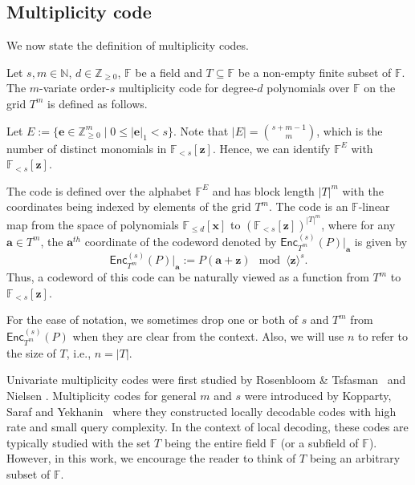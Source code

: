 \documentclass{theoretics}
\def\Integer{\mathbb{Z}}
\def\Natural{\mathbb{N}}
\def\Field{\mathbb{F}}
\let\N\Natural
\let\Z\Integer
\let\F\Field
\def\veca{\mathbf{a}}
\def\vece{\mathbf{e}}
\def\vecx{\mathbf{x}}
\def\vecz{\mathbf{z}}
\newcommand{\enc}{{\mathsf{Enc}}}
\newcommand{\encst}{{\mathsf{Enc}_{T^m}^{(s)}}}
\newcommand{\vz}{\vecz}
\newcommand{\vx}{\vecx}
\newcommand{\ve}{\vece}
\newcommand{\va}{\veca}
\begin{document}
	
	\subsection{Multiplicity code}\label{sec:mult}
	We now state the definition of multiplicity codes. 
	\begin{definition}\label{def:multiplicity code}
		Let $s, m \in \N$, $d \in \Z_{\geq 0}$, $\F$ be a field and $T \subseteq \F$ be a non-empty finite subset of $\F$. The $m$-variate order-$s$ multiplicity code for degree-$d$ polynomials over $\F$ on the grid $T^m$ is defined as follows.
		
		Let
		$E := \{\ve \in \Z_{\geq 0}^m \mid 0 \leq |\ve |_1 <
		s\}$.  Note that
		$|E| = \binom{s+ m -1}{m}$, which is the number of distinct
		monomials in $\F_{<s}[\vz]$. Hence, we can identify $\F^E$ with
		$\F_{<s}[\vz]$.
		
		The code is defined over the alphabet $\F^E$ and has block length $|T|^m$ with the coordinates being indexed by elements of the grid $T^m$. The code is an $\F$-linear map from  the space of polynomials $\F_{\leq d}[\vx]$ to $\left(\F_{< s}[\vz]\right)^{|T|^m}$, where for any $\va \in T^m$, the $\va^{th}$ coordinate of the codeword denoted by $\enc_{T^m}^{(s)}(P)|_{\va}$ is given by
		\[
		\enc_{T^m}^{(s)}(P)|_{\va} := P(\va + \vz) \mod \langle \vz \rangle^s. 
		\] 
		Thus, a codeword of this code can be naturally viewed as a function from $T^m$ to $\F_{<s}[\vz]$. 
	\end{definition}
	
	
	\begin{remark}\label{rmk: notation enc}
		For the ease of notation, we sometimes drop one or both of $s$ and
		$T^m$ from $\encst(P)$ when they are clear from the context. Also, we
		will use $n$ to refer to the size of $T$, i.e., $n= |T|$.
	\end{remark}
	
	Univariate multiplicity codes were first studied by Rosenbloom \&
	Tsfasman~\cite{RosenbloomT1997} and Nielsen
	\cite{Nielsen2001}. Multiplicity codes for general $m$ and $s$ were
	introduced by Kopparty, Saraf and Yekhanin~\cite{KoppartySY2014} where 
	they constructed locally decodable codes with high rate and small
	query complexity. In the context of local decoding, these codes are
	typically studied with the set $T$ being the entire field $\F$ (or a subfield of $\F$). However,
	in this work, we encourage the reader to think of $T$ being an
	arbitrary subset of $\F$.
	
\end{document}
